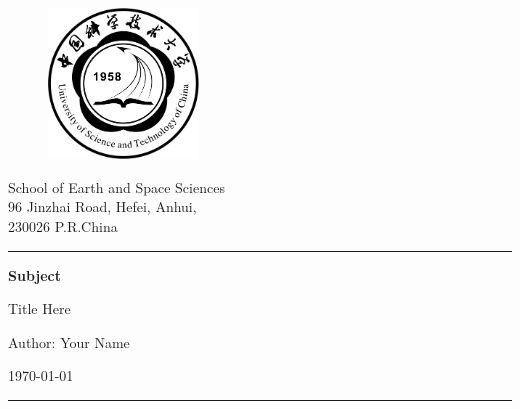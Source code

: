 
\begin{titlepage}

\begin{figure}[htbp]
    \centering
    \textcolor{ustcblue}{\includegraphics[align=c,width=4.0cm]{figures/ustc-badge.pdf}}
    \hspace{1.0cm}
\end{figure}


\vspace{-2cm}
\begin{flushright}
    {\small School of Earth and Space Sciences}\\
    {\small 96 Jinzhai Road, Hefei, Anhui,}\\
    {\small 230026 P.R.China}
\end{flushright}
\hrule
\vspace{1cm}


{\LARGE\noindent \textbf{Subject} \par}
\vspace{0.3cm}
{\Large\noindent Title Here \par}
\vspace{2cm}
{\LARGE\noindent Author: Your Name \par}
\vspace{0.5cm}
{\Large\noindent \today \par}
\vspace{7cm}
\hrule



\end{titlepage}
